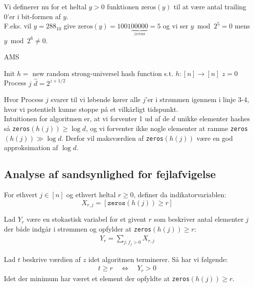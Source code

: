 Vi definerer nu for et heltal $y > 0$ funktionen zeros$(y)$ til at være antal trailing 0'er i bit-formen af $y$.\\

F.eks. vil $y = 288_{10}$ give $\text{zeros}(y) = 1001 \underbrace{00000}_{zeros} = 5$ og vi ser $y \bmod 2^5 = 0$ mens $y \bmod 2^6 \neq 0$.\\


\begin{algorithm}[H] \caption{AMS} \label{alg:ams}
  \nonl Init\;
  $h =$ new random strong-universel hash function s.t. $h : [n] \rightarrow [n]$\;
  $z = 0$\;
  \nonl Process $j$\;
  \Return $\hat d = 2^{z + 1/2}$
\end{algorithm}\vspace{1em}

Hvor Process $j$ svarer til vi løbende kører alle $j$'er i strømmen igennem i linje 3-4, hvor vi potentielt kunne stoppe på et vilkårligt tidspunkt.\\

Intuitionen for algoritmen er, at vi forventer 1 ud af de $d$ unikke elementer hashes så \texttt{zeros}$(h(j)) \geq \log d$, og vi forventer ikke nogle elementer at ramme \texttt{zeros}$(h(j)) \gg \log d$. Derfor vil maksværdien af \texttt{zeros}$(h(j))$ være en god approksimation af $\log d$.


\subsection{Analyse af sandsynlighed for fejlafvigelse}

For ethvert $j \in [n]$ og ethvert heltal $r \geq 0$, definer da indikatorvariablen:\\
$$
  X_{r,j} = [\mathtt{zeros}(h(j)) \geq r]
$$

Lad $Y_r$ være en stokastisk variabel for et givent $r$ som beskriver antal elementer $j$ der både indgår i strømmen og opfylder at \texttt{zeros}$(h(j)) \geq r$:
\begin{align}
  Y_r = \sum_{j: f_j > 0} X_{r,j} \label{eq:yr-def}
\end{align}

Lad $t$ beskrive værdien af $z$ idet algoritmen terminerer. Så har vi følgende:
\begin{align}
  t \geq r \quad \Longleftrightarrow \quad Y_r > 0  \label{eq:t-greater-eq-r}
\end{align}
Idet der minimum har været et element der opfyldte at \texttt{zeros}$(h(j)) \geq r$.\\

